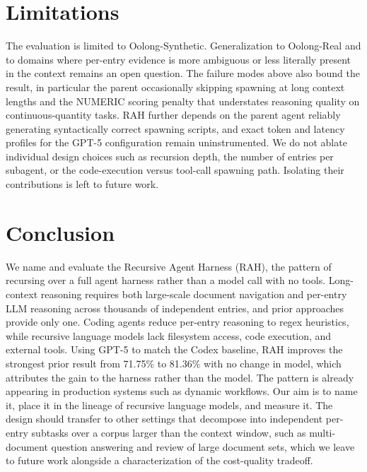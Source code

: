 \documentclass[sigconf,nonacm]{acmart}
\begin{document}
\section{Limitations}
\label{sec:limitations}

The evaluation is limited to Oolong-Synthetic. Generalization to Oolong-Real and to
domains where per-entry evidence is more ambiguous or less literally present in the
context remains an open question. The failure modes above also bound the result, in
particular the parent occasionally skipping spawning at long context lengths and the
NUMERIC scoring penalty that understates reasoning quality on continuous-quantity tasks.
RAH further depends on the parent agent reliably generating syntactically correct spawning
scripts, and exact token and latency profiles for the GPT-5 configuration remain
uninstrumented. We do not ablate individual design choices such as recursion depth, the
number of entries per subagent, or the code-execution versus tool-call spawning path.
Isolating their contributions is left to future work.


\section{Conclusion}
\label{sec:conclusion}

We name and evaluate the Recursive Agent Harness (RAH), the pattern of recursing over a full
agent harness rather than a model call with no tools. Long-context reasoning requires both
large-scale document navigation and per-entry LLM reasoning across thousands of independent
entries, and prior approaches provide only one. Coding agents reduce per-entry reasoning to
regex heuristics, while recursive language models lack filesystem access, code execution, and
external tools. Using GPT-5 to match the Codex baseline, RAH improves the strongest prior
result from 71.75\% to 81.36\% with no change in model, which attributes the gain to the
harness rather than the model. The pattern is already appearing in production systems such as
dynamic workflows. Our aim is to name it, place it in the lineage of recursive language models,
and measure it. The design should transfer to other settings that decompose into independent
per-entry subtasks over a corpus larger than the context window, such as multi-document
question answering and review of large document sets, which we leave to future work alongside
a characterization of the cost-quality tradeoff.
\end{document}
